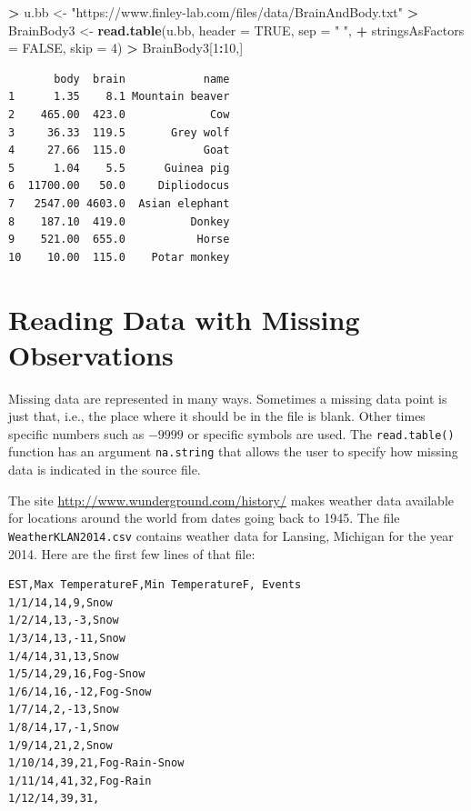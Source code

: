 \documentclass[
]{krantz}
\makeatletter
\newenvironment{Shaded}{\begin{snugshade}}{\end{snugshade}}
\newcommand{\DataTypeTok}[1]{\textcolor[rgb]{0.27,0.27,0.27}{#1}}
\newcommand{\DecValTok}[1]{\textcolor[rgb]{0.06,0.06,0.06}{#1}}
\newcommand{\KeywordTok}[1]{\textcolor[rgb]{0.27,0.27,0.27}{\textbf{#1}}}
\newcommand{\NormalTok}[1]{#1}
\newcommand{\OperatorTok}[1]{\textcolor[rgb]{0.43,0.43,0.43}{\textbf{#1}}}
\newcommand{\OtherTok}[1]{\textcolor[rgb]{0.37,0.37,0.37}{#1}}
\newcommand{\StringTok}[1]{\textcolor[rgb]{0.5,0.5,0.5}{#1}}
\newenvironment{kframe}{%
\medskip{}
\setlength{\fboxsep}{.8em}
 \def\at@end@of@kframe{}%
 \ifinner\ifhmode%
  \def\at@end@of@kframe{\end{minipage}}%
  \begin{minipage}{\columnwidth}%
 \fi\fi%
 \def\FrameCommand##1{\hskip\@totalleftmargin \hskip-\fboxsep
 \colorbox{shadecolor}{##1}\hskip-\fboxsep
     \hskip-\linewidth \hskip-\@totalleftmargin \hskip\columnwidth}%
 \MakeFramed {\advance\hsize-\width
   \@totalleftmargin\z@ \linewidth\hsize
   \@setminipage}}%
 {\par\unskip\endMakeFramed%
 \at@end@of@kframe}
\renewenvironment{Shaded}{\begin{kframe}}{\end{kframe}}
\makeatother
\begin{document}
\begin{Shaded}
\begin{Highlighting}[]
\OperatorTok{\textgreater{}}\StringTok{ }\NormalTok{u.bb \textless{}{-}}\StringTok{ "https://www.finley{-}lab.com/files/data/BrainAndBody.txt"}
\OperatorTok{\textgreater{}}\StringTok{ }\NormalTok{BrainBody3 \textless{}{-}}\StringTok{ }\KeywordTok{read.table}\NormalTok{(u.bb, }\DataTypeTok{header =} \OtherTok{TRUE}\NormalTok{, }\DataTypeTok{sep =} \StringTok{" "}\NormalTok{, }
\OperatorTok{+}\StringTok{                          }\DataTypeTok{stringsAsFactors =} \OtherTok{FALSE}\NormalTok{, }\DataTypeTok{skip =} \DecValTok{4}\NormalTok{)}
\OperatorTok{\textgreater{}}\StringTok{ }\NormalTok{BrainBody3[}\DecValTok{1}\OperatorTok{:}\DecValTok{10}\NormalTok{,]}
\end{Highlighting}
\end{Shaded}

\begin{verbatim}
       body  brain            name
1      1.35    8.1 Mountain beaver
2    465.00  423.0             Cow
3     36.33  119.5       Grey wolf
4     27.66  115.0            Goat
5      1.04    5.5      Guinea pig
6  11700.00   50.0     Dipliodocus
7   2547.00 4603.0  Asian elephant
8    187.10  419.0          Donkey
9    521.00  655.0           Horse
10    10.00  115.0    Potar monkey
\end{verbatim}

\hypertarget{reading-data-with-missing-observations}{%
\section{Reading Data with Missing Observations}\label{reading-data-with-missing-observations}}

Missing data are represented in many ways. Sometimes a missing data point is just that, i.e., the place where it should be in the file is blank. Other times specific numbers such as \(-9999\) or specific symbols are used. The \texttt{read.table()} function has an argument \texttt{na.string} that allows the user to specify how missing data is indicated in the source file.

The site \url{http://www.wunderground.com/history/} makes weather data available for locations around the world from dates going back to 1945. The file \texttt{WeatherKLAN2014.csv} contains weather data for Lansing, Michigan for the year 2014. Here are the first few lines of that file:

\begin{verbatim}
EST,Max TemperatureF,Min TemperatureF, Events
1/1/14,14,9,Snow
1/2/14,13,-3,Snow
1/3/14,13,-11,Snow
1/4/14,31,13,Snow
1/5/14,29,16,Fog-Snow
1/6/14,16,-12,Fog-Snow
1/7/14,2,-13,Snow
1/8/14,17,-1,Snow
1/9/14,21,2,Snow
1/10/14,39,21,Fog-Rain-Snow
1/11/14,41,32,Fog-Rain
1/12/14,39,31,
\end{verbatim}
\end{document}
